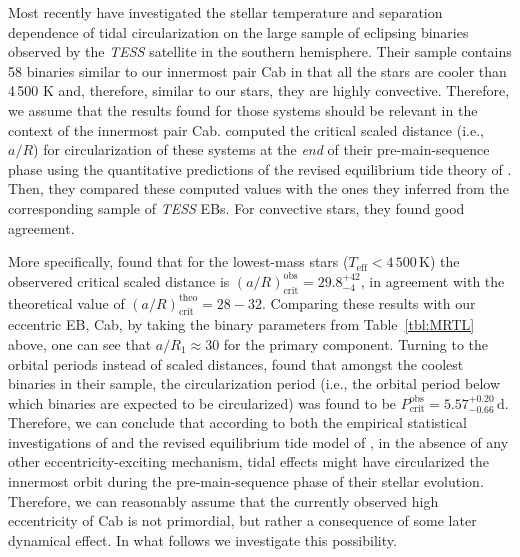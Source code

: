 \documentclass[fleqn,usenatbib]{mnras} %
\begin{document}
Most recently \citet{Justesen2021} have investigated the stellar temperature and separation dependence of tidal circularization on the large sample of eclipsing binaries observed by the {\em TESS} satellite in the southern hemisphere. Their sample contains 58 binaries similar to our innermost pair Cab in that all the stars are cooler than 4\,500 K and, therefore, similar to our stars, they are highly convective. Therefore, we assume that the results found for those systems should be relevant in the context of the innermost pair Cab. \citet{Justesen2021} computed the critical scaled distance (i.e., $a/R$) for circularization of these systems at the {\em end} of their pre-main-sequence phase using the quantitative predictions of the revised equilibrium tide theory of \citet[][Table 2]{zahn89}. Then, they compared these computed values with the ones they inferred from the corresponding sample of {\em TESS} EBs.  For convective stars, they found good agreement.

More specifically, \citet{Justesen2021} found that for the lowest-mass stars ($T_\mathrm{eff}<4\,500$\,K) the observered critical scaled distance is $(a/R)_\mathrm{crit}^\mathrm{obs}=29.8_{-4}^{+42}$, in agreement with the theoretical value of $(a/R)_\mathrm{crit}^\mathrm{theo}=28-32$. Comparing these results with our eccentric EB, Cab, by taking the binary parameters from Table~\ref{tbl:MRTL} above, one can see that $a/R_1\approx30$ for the primary component.  Turning to the orbital periods instead of scaled distances, \citet{Justesen2021} found that amongst the coolest binaries in their sample, the circularization period (i.e., the orbital period below which binaries are expected to be circularized) was found to be $P_\mathrm{crit}^\mathrm{obs}=5.57_{-0.66}^{+0.20}$\,d. Therefore, we can conclude that according to both the empirical statistical investigations of \citet{Justesen2021} and the revised equilibrium tide model of \citet{zahn89}, in the absence of any other eccentricity-exciting mechanism, tidal effects might have circularized the innermost orbit during the pre-main-sequence phase of their stellar evolution. Therefore, we can reasonably assume that the currently observed high eccentricity of Cab is not primordial, but rather a consequence of some later dynamical effect. In what follows we investigate this possibility.
\end{document}
